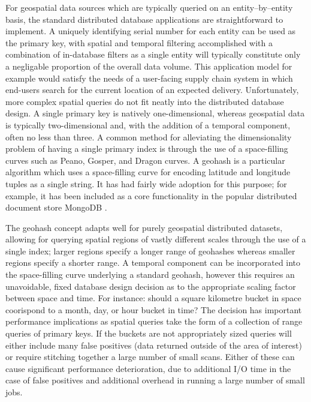 \documentclass[nips13submit_09,times,art10]{article} %
\begin{document}
For geospatial data sources which are typically queried on an entity--by--entity basis, the
standard distributed database applications are straightforward to implement. A uniquely
identifying serial number for each entity can be used as the primary key, with spatial
and temporal filtering accomplished with a combination of in-database filters as a single
entity will typically constitute only a negligable proportion of the overall data volume.
This application model for example would satisfy the needs of a user-facing supply chain
system in which end-users search for the current location of an expected delivery.
Unfortunately, more complex spatial queries do not fit neatly into the distributed database
design. A single primary key is natively one-dimensional, whereas geospatial data
is typically two-dimensional and, with the addition of a temporal component, often
no less than three. A common method for alleviating the dimensionality problem of having a single primary
index is through the use of a space-filling curves such as Peano, Gosper, and Dragon
curves. A geohash is a particular algorithm which uses a space-filling curve for
encoding latitude and longitude tuples as a single string. It has had fairly wide adoption
for this purpose; for example, it has been included as a core functionality in the popular
distributed document store MongoDB \cite{chodorow2013mongodb}.

The geohash concept adapts well for purely geospatial distributed datasets, allowing for
querying spatial regions of vastly different scales through the use of a single index; larger
regions specify a longer range of geohashes whereas smaller regions specify a shorter range.
A temporal component can be incorporated into the space-filling curve underlying a standard
geohash, however this requires an unavoidable, fixed database design decision as to the
appropriate scaling factor between space and time. For instance: should a square kilometre
bucket in space coorispond to a month, day, or hour bucket in time? The decision has
important performance implications as spatial queries take the form of a collection of
range queries of primary keys. If the buckets are not appropriately sized queries will either
include many false positives (data returned outside of the area of interest) or require
stitching together a large number of small scans. Either of these can cause significant
performance deterioration, due to additional I/O time in the case of false positives and
additional overhead in running a large number of small jobs.
\end{document}
